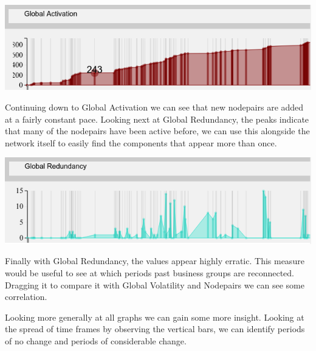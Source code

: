 \begin{center}
\includegraphics[trim={0 0 0 0}, width=140mm]{./Figures/TurinGlobalActivation.png}
\end{center}       
Continuing down to Global Activation we can see that new nodepairs are added at a fairly constant pace. Looking next at Global Redundancy, the peaks indicate that many of the nodepairs have been active before, we can use this alongside the network itself to easily find the components that appear more than once.
    
\begin{center}
\includegraphics[trim={0 0 0 0}, width=140mm]{./Figures/TurinGlobalRedundancy.png}
\end{center}
Finally with Global Redundancy, the values appear highly erratic. This measure would be useful to see at which periods past business groups are reconnected. Dragging it to compare it with Global Volatility and Nodepairs we can see some correlation.


Looking more generally at all graphs we can gain some more insight. Looking at the spread of time frames by observing the vertical bars, we can identify periods of no change and periods of considerable change. 
    
\begin{center}
\end{center}

